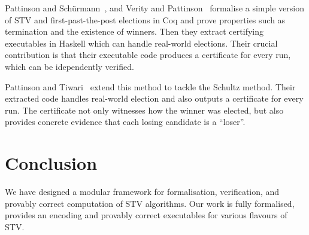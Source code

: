 \documentclass{llncs}
\begin{document}
Pattinson and Sch\"urmann~\cite{DBLP:conf/ausai/PattinsonS15}, and
Verity and Pattinson~\cite{DBLP:conf/acsw/VerityP17} formalise a
simple version of STV and first-past-the-post elections in Coq and
prove properties such as termination and the existence of winners.
Then they extract certifying executables in Haskell which can handle
real-world elections. Their crucial contribution is that their
executable code produces a certificate for every run, which can be
idependently verified. 

Pattinson and Tiwari~\cite{DBLP:conf/itp/PattinsonT17} extend this
method to tackle the Schultz method.  Their extracted code handles
real-world election and also outputs a certificate for every run.
The certificate not only witnesses how the winner was elected, but also
provides concrete evidence that each losing candidate is a ``loser''.

\iffalse
Dawson et al~\cite{DBLP:conf/voteid/DawsonGM15} formalise a version of
Hare-Clark in the theorem prover HOL~\cite{hol4}. Their specification
is expressed in the Higher-Order-Logic. Moreover, they encode
computational definition inside HOL and prove its correctness against
the HOL specification of the protocol.  Then to actually compute, they
manually transliterate the computational definitions from HOL into the
syntax of Standard ML functional language.  A significant issue
with\marginpar{This prose is not acceptable to me. I have reworded it above.}
this approach is existence of no guarantee that the transliterate
encoding would behave according to the original HOL definitions,
simply because of semantic differences of HOL and SML. Therefore,
their verification does not legitimately extend beyond HOL to the SML
programme.
\fi
\section{Conclusion}
We have designed a modular framework for formalisation, verification, 
and provably correct computation of STV algorithms. Our work
is fully formalised, provides an encoding and provably correct
executables for various flavours of STV. 

%
\end{document}
